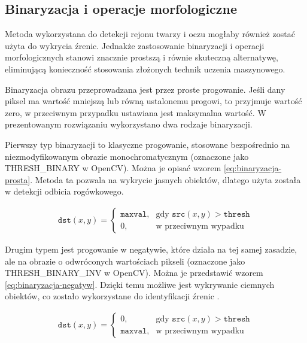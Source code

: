 \documentclass[a4paper,twoside,12pt]{book}
\begin{document}
\subsection{Binaryzacja i operacje morfologiczne}
\label{subsec:Binaryzacja-i-operacje-morfologiczne}

Metoda wykorzystana do detekcji rejonu twarzy i oczu mogłaby również zostać użyta do wykrycia źrenic. Jednakże zastosowanie binaryzacji i operacji morfologicznych stanowi znacznie prostszą i równie skuteczną alternatywę, eliminującą konieczność stosowania złożonych technik uczenia maszynowego.

Binaryzacja obrazu przeprowadzana jest przez proste progowanie. Jeśli dany piksel ma wartość mniejszą lub równą ustalonemu progowi, to przyjmuje wartość zero, w przeciwnym przypadku ustawiana jest maksymalna wartość. W prezentowanym rozwiązaniu wykorzystano dwa rodzaje binaryzacji.

Pierwszy typ binaryzacji to klasyczne progowanie, stosowane bezpośrednio na niezmodyfikowanym obrazie monochromatycznym (oznaczone jako THRESH\_BINARY w OpenCV). Można je opisać wzorem \ref{eq:binaryzacja-prosta}. Metoda ta pozwala na wykrycie jasnych obiektów, dlatego użyta została w detekcji odbicia rogówkowego.

\begin{align}
    \texttt{dst}(x,y) =
    \begin{cases} 
        \texttt{maxval}, & \text{gdy } \texttt{src}(x,y) > \texttt{thresh} \\
        0, & \text{w przeciwnym wypadku}
    \end{cases}
	\label{eq:binaryzacja-prosta}
\end{align}

Drugim typem jest progowanie w negatywie, które działa na tej samej zasadzie, ale na obrazie o odwróconych wartościach pikseli (oznaczone jako THRESH\_BINARY\_INV w OpenCV). Można je przedstawić wzorem \ref{eq:binaryzacja-negatyw}. Dzięki temu możliwe jest wykrywanie ciemnych obiektów, co zostało wykorzystane do identyfikacji źrenic \cite{bib:Binaryzacja-OpenCV}.

\begin{align}
    \texttt{dst}(x,y) =
    \begin{cases} 
        0, & \text{gdy } \texttt{src}(x,y) > \texttt{thresh} \\
        \texttt{maxval}, & \text{w przeciwnym wypadku}
    \end{cases}
	\label{eq:binaryzacja-negatyw}
\end{align}
\end{document}
